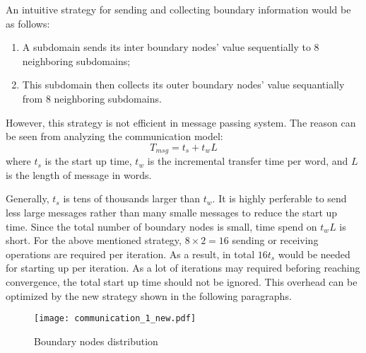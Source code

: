 \documentclass{sig-alternate}
\begin{document}
	An intuitive strategy for sending and collecting boundary information would be as follows:

	\begin{enumerate}[1.]
	  \item A subdomain sends its inter boundary nodes' value sequentially to 8 neighboring subdomains;
	  \item This subdomain then collects its outer boundary nodes' value sequantially from 8 neighboring subdomains.
	\end{enumerate}	

 	However, this strategy is not efficient in message passing system. The reason can be seen from analyzing the
	communication model:
	\begin{equation}
		T_{msg} = t_s + t_wL\label{eq_msg}
	\end{equation}
	where $t_s$ is the start up time, $t_w$ is the incremental transfer time per word, and $L$ is the length of message in words.
	
	Generally, $t_s$ is tens of thousands larger than $t_w$. It is highly perferable to send less 
	large messages rather than many smalle messages to reduce the start up time. Since the total number of boundary nodes is small, 
	time spend on $t_wL$ is short. For the above mentioned strategy, $8\times 2 = 
	16$ sending or receiving operations are required per iteration. As a result, in total $16t_s$ 
	would be needed for starting up per iteration. As a lot of iterations may required beforing reaching convergence, the total 
	start up time should not be ignored. This overhead can be optimized by the new strategy shown in the following paragraphs.
\begin{comment}
	In each iteration, only $2$ transferring operations are needed for communication. The new strategy minimizes start up time and 
	greatly decreases the simulation time. However, there is some difficulty to implement above strategy. This is not only because
	the grid connection is irregular, but also because the existance of overlapping. Overlapping makes things even more complicated, 
	as the number of neighboring subdomains are increased from $4$ to $8$, with different overlapping patterns. To overcome this 
	problem, this paper proposes a irregular grid and overlapping friendly communication strategy that achieves optimal 
	minimum communication overhead, which is illustrated as follows.
\end{comment}
	\begin{figure}[htbp]
	  \centering
	  \texttt{[image: communication\_1\_new.pdf]}
	  \caption{Boundary nodes distribution}
	  \label{comm}
	\end{figure}
\end{document}
